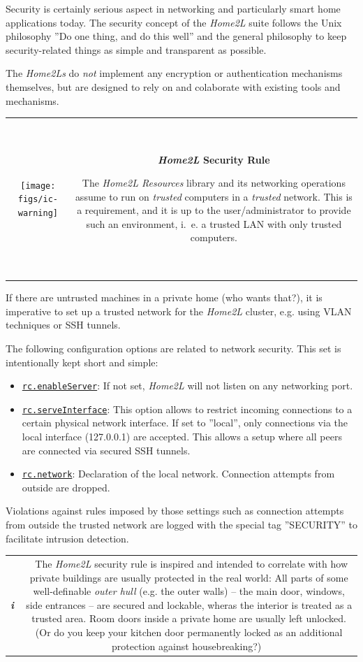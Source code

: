 \documentclass[12pt,english,parskip=half]{scrreprt}
\newcommand{\infobox}[1]{
  \hfill
  \setlength\arrayrulewidth{1pt}
  \begin{tabular}[t]{c|c|}
    \parbox{1.8em}{\hfill\textit{\Huge\textbf{i}\,}}
    &
    \,\parbox{0.89\linewidth}{\setlength{\parskip}{0.5em}#1}\,
  \end{tabular}
  \par
}
\newcommand{\warnbox}[1]{
  \hfill
  \setlength\arrayrulewidth{1pt}
  \begin{tabular}[b]{c|c|}
    \texttt{[image: figs/ic-warning]}   %
    &
    \,\parbox{0.89\linewidth}{\setlength{\parskip}{0.5em}#1}\,
  \end{tabular}
  \par
}
\newcommand{\idx}[1]{#1\index{#1}}
\newcommand{\envref}[1]{\hyperref[env:#1]{\texttt{#1}}}        %
\begin{document}
Security is certainly serious aspect in networking and particularly smart home
applications today.
The security concept of the \emph{Home2L} suite follows the Unix philosophy
''Do one thing, and do this well'' and the general philosophy to keep
security-related things as simple and transparent as possible.

The \emph{Home2Ls} do \emph{not} implement any encryption or authentication mechanisms themselves, but are designed to rely on and colaborate with existing tools and mechanisms.

\warnbox{
  \textbf{\emph{Home2L} Security Rule}

  The \emph{Home2L Resources} library and its networking operations assume to run on
  \emph{trusted} computers in a \emph{trusted} network.
  This is a requirement, and it is up to the user/administrator to provide
  such an environment, i.~e. a trusted LAN with only trusted computers.
}

If there are untrusted machines in a private home (who wants that?),
it is imperative to set up a trusted network for the \emph{Home2L} cluster,
e.g. using VLAN techniques or SSH tunnels.

The following configuration options are related to network security.
This set is intentionally kept short and simple:

\begin{itemize}
\item
  \envref{rc.enableServer}: If not set, \emph{Home2L} will not listen on any networking port.
\item
  \envref{rc.serveInterface}: This option allows to restrict incoming connections
  to a certain physical network interface. If set to ”local”, only connections via
  the local interface (127.0.0.1) are accepted. This allows a setup where
  all peers are connected via secured SSH tunnels.
\item
  \envref{rc.network}: Declaration of the local network. Connection attempts
  from outside are dropped.
\end{itemize}

Violations against rules imposed by those settings such as connection
attempts from outside the trusted network are logged with the special
tag ''SECURITY'' to facilitate intrusion detection.

\infobox{
  The \emph{Home2L} security rule is inspired and intended to correlate with how private
  buildings are usually protected in the real world:
  All parts of some well-definable \emph{outer hull} (e.g. the outer walls) -- the
  main door,  windows, side entrances -- are secured and lockable, wheras the
  interior is treated as a trusted area. Room doors inside a private home are usually
  left unlocked. (Or do you keep your kitchen door permanently locked as an additional
  protection against housebreaking?)
}
\end{document}
